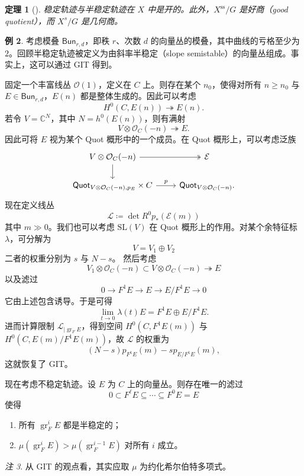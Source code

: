 \documentclass{amsart}
\newtheorem{thm}{定理}[section]
\theoremstyle{definition}
\newtheorem{exm}[thm]{例}
\theoremstyle{remark}
\newtheorem{rmk}[thm]{注}
\theoremstyle{plain}
\theoremstyle{definition}
\theoremstyle{remark}
\newcommand{\C}{\mathbb{C}}
\newcommand{\mc}[1]{\mathcal{#1}}
\newcommand{\mr}[1]{\mathrm{#1}}
\newcommand{\on}[1]{\operatorname{#1}}
\newcommand{\ms}[1]{\mathsf{#1}}
\newcommand{\1}{\mathbf{1}}
\newcommand{\2}{\mathbf{2}}
\newcommand{\3}{\mathbf{3}}
\begin{document}
\begin{thm}[{\cite{MFK1994}}]
    稳定轨迹与半稳定轨迹在 \(X\) 中是开的。此外，\(X^{\on{ss}}/G\) 是好商（good quotient），而 \(X^s/G\) 是几何商。  
\end{thm}

\begin{exm}
    考虑模叠 \(\ms{Bun}_{r,d}\)，即秩 \(r\)、次数 \(d\) 的向量丛的模叠，其中曲线的亏格至少为 \(2\)。回顾半稳定轨迹被定义为由斜率半稳定（slope semistable）的向量丛组成。事实上，这可以通过 GIT 得到。

    固定一个丰富线丛 \(\mc{O}(1)\)，定义在 \(C\) 上。则存在某个 \(n_0\)，使得对所有 \(n \geq n_0\) 与 \(E \in \ms{Bun}_{r,d}\)，\(E(n)\) 都是整体生成的。因此可以考虑
    \[ H^0(C, E(n)) \twoheadrightarrow E(n). \]
    若令 \(V = \C^N\)，其中 \(N = h^0(E(n))\)，则有满射
    \[ V \otimes \mc{O}_C(-n) \twoheadrightarrow E. \]
    因此可将 \(E\) 视为某个 Quot 概形中的一个成员。在 Quot 概形上，可以考虑泛族
    \begin{equation*}
    \begin{tikzcd}
        V \otimes \mc{O}_C(-n) \ar[twoheadrightarrow]{r} \ar{d} & \mc{E} \\
        \ms{Quot}_{V \otimes \mc{O}_C(-n), p_E} \times C \ar{r}{p} & \ms{Quot}_{V \otimes \mc{O}_C(-n)}.
    \end{tikzcd}
    \end{equation*}
    现在定义线丛
    \[ \mc{L} \coloneqq \det R^0 p_* (\mc{E}(m)) \]
    其中 \(m \gg 0\)。我们也可以考虑 \(\mr{SL}(V)\) 在 Quot 概形上的作用。对某个余特征标 \(\lambda\)，可分解为
    \[ V = V_1 \oplus V_2 \]
    二者的权重分别为 \(s\) 与 \(N-s\)。
    然后考虑
    \[ V_1 \otimes \mc{O}_C(-n) \subset V \otimes \mc{O}_C(-n) \twoheadrightarrow E \]
    以及滤过
    \[ 0 \to F^1 E \to E \to E / F^1 E \to 0 \]
    它由上述包含诱导。于是可得
    \[ \lim_{t \to 0} \lambda(t) E = F^1 E \oplus E/F^1 E. \]
    进而计算限制 \(\mc{L}_{|\on{gr}_F E}\)，得到空间 \(H^0(C, F^1 E(m))\) 与 \(H^0(C, E(m)/F^1 E(m))\)，故 \(\mc{L}\) 的权重为
    \[ (N-s) p_{F^1 E}(m) - s p_{E/F^1 E}(m), \]
    这就恢复了 GIT。
\end{exm}

现在考虑不稳定轨迹。设 \(E\) 为 \(C\) 上的向量丛。则存在唯一的滤过
\[ 0 \subset F^{\ell} E \subseteq \cdots \subseteq F^0 E = E \]
使得
\begin{enumerate}
    \item 所有 \(\on{gr}_F^i E\) 都是半稳定的；
    \item \(\mu(\on{gr}_F^i E) > \mu(\on{gr}_F^{i-1} E)\) 对所有 \(i\) 成立。 
\end{enumerate}
\begin{rmk}
    从 GIT 的观点看，其实应取 \(\mu\) 为约化希尔伯特多项式。
\end{rmk}
\end{document}
